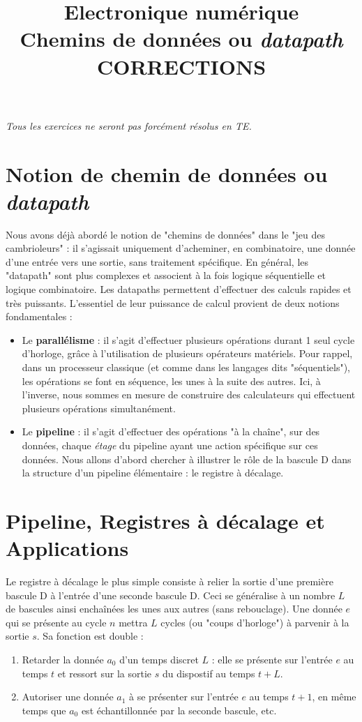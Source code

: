\documentclass[a4paper,11pt]{article}
\title{{\Huge Electronique numérique}\\Chemins de données ou {\it datapath}\\CORRECTIONS}
\date{}
\begin{document}
\maketitle
{\it Tous les exercices ne seront pas forcément résolus en TE.}

\section{Notion de chemin de données ou {\it datapath}}

Nous avons déjà abordé le notion de "chemins de données"  dans le "jeu des cambrioleurs" : il s'agissait
uniquement d'acheminer, en combinatoire, une donnée d'une entrée vers une sortie, sans traitement spécifique. En général, les "datapath" sont plus complexes
et associent à la fois logique séquentielle et logique combinatoire. Les datapaths permettent d'effectuer des calculs rapides et très puissants. L'essentiel de leur puissance
de calcul provient de deux notions fondamentales :
\begin{itemize}
  \item Le \textbf{parallélisme} : il s'agit d'effectuer plusieurs opérations durant 1 seul cycle d'horloge, grâce à l'utilisation de plusieurs opérateurs matériels.
  Pour rappel, dans un processeur classique (et comme dans les langages dits "séquentiels"), les opérations se font en séquence, les unes à la suite des autres. Ici, à l'inverse,
  nous sommes en mesure de construire des calculateurs qui effectuent plusieurs opérations simultanément.
  \item Le \textbf{pipeline} : il s'agit d'effectuer des opérations "à la chaîne", sur des données, chaque {\it étage} du pipeline ayant une action spécifique sur ces données.
  Nous allons d'abord chercher à illustrer le rôle de la bascule D dans la structure d'un pipeline élémentaire : le registre à décalage.
\end{itemize}


\section{Pipeline, Registres à décalage et Applications}
Le registre à décalage le plus simple consiste à relier la sortie d'une première bascule D à l'entrée d'une seconde bascule D.
Ceci se généralise à un nombre $L$ de bascules ainsi enchaînées les unes aux autres (sans rebouclage).
Une donnée $e$ qui se présente au cycle $n$ mettra $L$ cycles (ou "coups d'horloge") à parvenir à la sortie $s$.
Sa fonction est double :
\begin{enumerate}
  \item Retarder  la donnée $a_0$ d'un temps discret $L$ : elle se présente sur l'entrée $e$ au temps $t$ et ressort sur la sortie $s$ du dispostif au temps $t+L$.
  \item Autoriser une donnée $a_1$ à se présenter sur l'entrée $e$ au temps $t+1$, en même temps que $a_0$ est échantillonnée par la seconde bascule, etc.
\end{enumerate}
\end{document}
